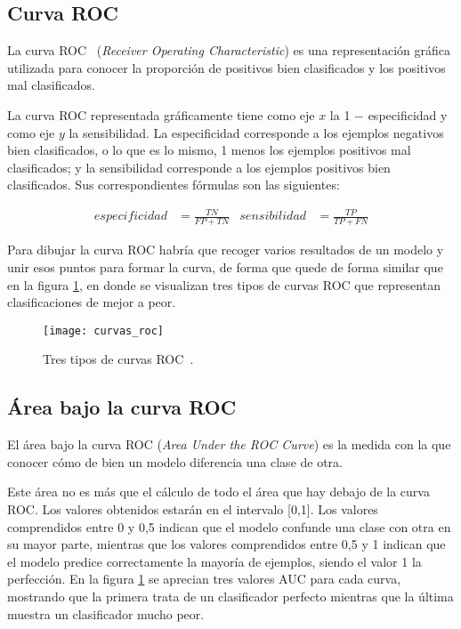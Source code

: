 \subsection{Curva ROC}
La curva ROC~\cite{wiki:roc} (\textit{Receiver Operating Characteristic}) es una representación gráfica utilizada para conocer la proporción de positivos bien clasificados y los positivos mal clasificados.

La curva ROC representada gráficamente tiene como eje $x$ la 1 $-$ especificidad y como eje $y$ la sensibilidad. La especificidad corresponde a los ejemplos negativos bien clasificados, o lo que es lo mismo, 1 menos los ejemplos positivos mal clasificados; y la sensibilidad corresponde a los ejemplos positivos bien clasificados. Sus correspondientes fórmulas son las siguientes:

\begin{align}
	especificidad &= \frac{TN}{FP+TN} &
	sensibilidad &= \frac{TP}{TP+FN}
\end{align}

Para dibujar la curva ROC habría que recoger varios resultados de un modelo y unir esos puntos para formar la curva, de forma que quede de forma similar que en la figura \ref{fig:roc}, en donde se visualizan tres tipos de curvas ROC que representan clasificaciones de mejor a peor.

\begin{figure}[h]
	\texttt{[image: curvas\_roc]}
	\caption[Tres tipos de curvas ROC.]{Tres tipos de curvas ROC~\cite{wiki:roc}.}
	\label{fig:roc}
\end{figure}

\subsection{Área bajo la curva ROC}
El área bajo la curva ROC (\textit{Area Under the ROC Curve}) es la medida con la que conocer cómo de bien un modelo diferencia una clase de otra.

Este área no es más que el cálculo de todo el área que hay debajo de la curva ROC. Los valores obtenidos estarán en el intervalo [0,1]. Los valores comprendidos entre 0 y 0,5 indican que el modelo confunde una clase con otra en su mayor parte, mientras que los valores comprendidos entre 0,5 y 1 indican que el modelo predice correctamente la mayoría de ejemplos, siendo el valor 1 la perfección. En la figura \ref{fig:roc} se aprecian tres valores AUC para cada curva, mostrando que la primera trata de un clasificador perfecto mientras que la última muestra un clasificador mucho peor.
